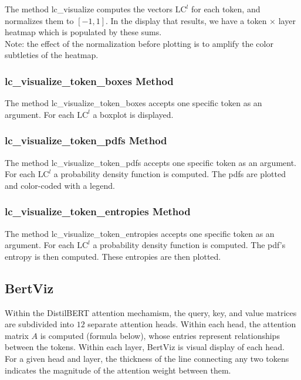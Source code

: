 \documentclass{article}
\begin{document}
The method lc\_visualize computes the vectors $\text{LC}^{l}$ for each token, and normalizes them to $[-1,1]$.  In the display that results, we have a token $\times$ layer heatmap which is populated by these sums. \\

Note: the effect of the normalization before plotting is to amplify the color subtleties of the heatmap.

\subsubsection*{lc\_visualize\_token\_boxes Method}

The method lc\_visualize\_token\_boxes accepts one specific token as an argument.  For each $\text{LC}^{l}$ a boxplot is displayed.

\subsubsection*{lc\_visualize\_token\_pdfs Method}

The method lc\_visualize\_token\_pdfs accepts one specific token as an argument.   For each $\text{LC}^{l}$ a probability density function is computed.  The pdfs are plotted and color-coded with a legend.

\subsubsection*{lc\_visualize\_token\_entropies Method}

The method lc\_visualize\_token\_entropies accepts one specific token as an argument.   For each $\text{LC}^{l}$ a probability density function is computed.  The pdf's entropy is then computed.  These entropies are then plotted.

\subsection{BertViz}

Within the DistilBERT attention mechamism, the query, key, and value matrices are subdivided into $12$ separate attention heads.  Within each head, the attention matrix $A$ is computed (formula below), whose entries represent relationships between the tokens.  Within each layer, BertViz is visual display of each head.  \\

For a given head and layer, the thickness of the line connecting any two tokens indicates the magnitude of the attention weight between them.
\end{document}
